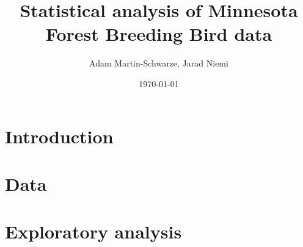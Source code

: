 \documentclass{article}
\title{Statistical analysis of Minnesota Forest Breeding Bird data}
\author{Adam Martin-Schwarze, Jarad Niemi}
\date{\today}
\begin{document}
\maketitle
\tableofcontents
\newpage


\section{Introduction}



\section{Data} 



\section{Exploratory analysis}


\end{document}
